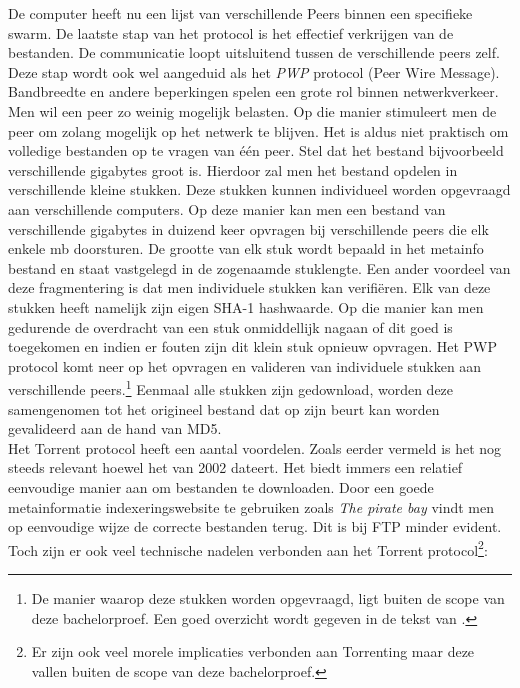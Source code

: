De computer heeft nu een lijst van verschillende Peers binnen een specifieke swarm. De laatste stap van het protocol is het effectief verkrijgen van de bestanden. De communicatie loopt uitsluitend tussen de verschillende peers zelf. Deze stap wordt ook wel aangeduid als het \textit{PWP} protocol (Peer Wire Message). Bandbreedte en andere beperkingen spelen een grote rol binnen netwerkverkeer. Men wil een peer zo weinig mogelijk belasten. Op die manier stimuleert men de peer om zolang mogelijk op het netwerk te blijven. Het is aldus niet praktisch om volledige bestanden op te vragen van één peer. Stel dat het bestand bijvoorbeeld verschillende gigabytes groot is. Hierdoor zal men het bestand opdelen in verschillende kleine stukken. Deze stukken kunnen individueel worden opgevraagd aan verschillende computers. Op deze manier kan men een bestand van verschillende gigabytes in duizend keer opvragen bij verschillende peers die elk enkele mb doorsturen. De grootte van elk stuk wordt bepaald in het metainfo bestand en staat vastgelegd in de zogenaamde stuklengte. Een ander voordeel van deze fragmentering is dat men individuele stukken kan verifiëren. Elk van deze stukken heeft namelijk zijn eigen SHA-1 hashwaarde. Op die manier kan men gedurende de overdracht van een stuk onmiddellijk nagaan of dit goed is toegekomen en indien er fouten zijn dit klein stuk opnieuw opvragen. Het PWP protocol komt neer op het opvragen en valideren van individuele stukken aan verschillende peers.\footnote{De manier waarop deze stukken worden opgevraagd, ligt buiten de scope van deze bachelorproef. Een goed overzicht wordt gegeven in de tekst van \textcite{Fonseca2005}.} Eenmaal alle stukken zijn gedownload, worden deze samengenomen tot het origineel bestand dat op zijn beurt kan worden gevalideerd aan de hand van MD5.\\

Het Torrent protocol heeft een aantal voordelen. Zoals eerder vermeld is het nog steeds relevant hoewel het van 2002 dateert. Het biedt immers een relatief eenvoudige manier aan om bestanden te downloaden. Door een goede metainformatie indexeringswebsite te gebruiken zoals \textit{The pirate bay} vindt men op eenvoudige wijze de correcte bestanden terug. Dit is bij FTP minder evident.\\

Toch zijn er ook veel technische nadelen verbonden aan het Torrent protocol\footnote{Er zijn ook veel morele implicaties verbonden aan Torrenting maar deze vallen buiten de scope van deze bachelorproef.}:

